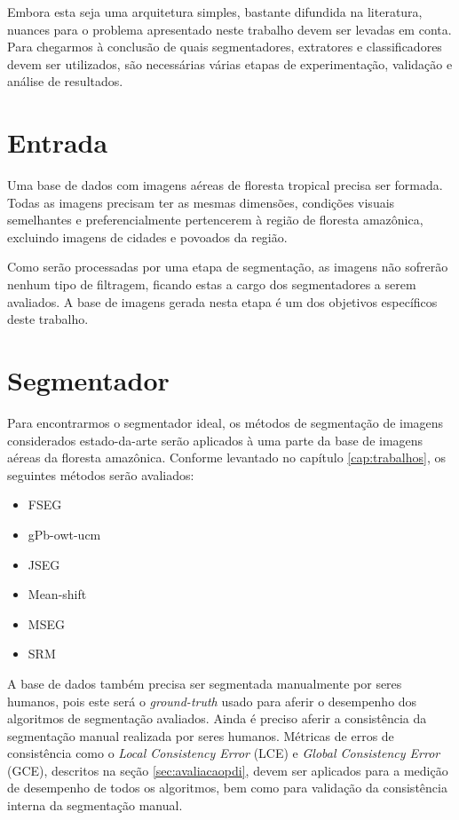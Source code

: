 Embora esta seja uma arquitetura simples, bastante difundida na literatura, nuances para o problema apresentado neste trabalho devem ser levadas em conta. Para chegarmos à conclusão de quais segmentadores, extratores e classificadores devem ser utilizados, são necessárias várias etapas de experimentação, validação e análise de resultados.

\section{Entrada}

Uma base de dados com imagens aéreas de floresta tropical precisa ser formada. Todas as imagens precisam ter as mesmas dimensões, condições visuais semelhantes e preferencialmente pertencerem à região de floresta amazônica, excluindo imagens de cidades e povoados da região.

Como serão processadas por uma etapa de segmentação, as imagens não sofrerão nenhum tipo de filtragem, ficando estas a cargo dos segmentadores a serem avaliados. A base de imagens gerada nesta etapa é um dos objetivos específicos deste trabalho.

\section{Segmentador}\label{sec:metSegmentador}


Para encontrarmos o segmentador ideal, os métodos de segmentação de imagens considerados estado-da-arte serão aplicados à uma parte da base de imagens aéreas da floresta amazônica. Conforme levantado no capítulo \ref{cap:trabalhos}, os seguintes métodos serão avaliados:

\begin{itemize}
	\item FSEG
	\item gPb-owt-ucm
	\item JSEG
	\item Mean-shift
	\item MSEG
	\item SRM
\end{itemize}

A base de dados também precisa ser segmentada manualmente por seres humanos, pois este será o \textit{ground-truth} usado para aferir o desempenho dos algoritmos de segmentação avaliados. Ainda é preciso aferir a consistência da segmentação manual realizada por seres humanos. Métricas de erros de consistência como o \textit{Local Consistency Error} (LCE) e \textit{Global Consistency Error} (GCE), descritos na seção \ref{sec:avaliacaopdi}, devem ser aplicados para a medição de desempenho de todos os algoritmos, bem como para validação da consistência interna da segmentação manual.

